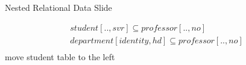 

\newcommand{\nestedStudentSupervisorInclusionDependency}
{student[..,svr] \subseteq professor[..,no]}

\newcommand{\nestedHeadOfDeptInclusionDependency}
{department[identity,hd]  \subseteq professor[..,no]}

\begin{frame}{Nested Relational Data Slide}

\begin{align*}
\nestedStudentSupervisorInclusionDependency\\
\nestedHeadOfDeptInclusionDependency  \\
\end{align*}
{\small{move student table to the left}}
\end{frame}
